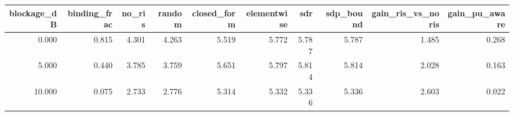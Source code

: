\begin{tabular}{rrrrrrrrrr}
\toprule
blockage_dB & binding_frac & no_ris & random & closed_form & elementwise & sdr & sdp_bound & gain_ris_vs_noris & gain_pu_aware \\
\midrule
0.000 & 0.815 & 4.301 & 4.263 & 5.519 & 5.772 & 5.787 & 5.787 & 1.485 & 0.268 \\
5.000 & 0.440 & 3.785 & 3.759 & 5.651 & 5.797 & 5.814 & 5.814 & 2.028 & 0.163 \\
10.000 & 0.075 & 2.733 & 2.776 & 5.314 & 5.332 & 5.336 & 5.336 & 2.603 & 0.022 \\
\bottomrule
\end{tabular}
